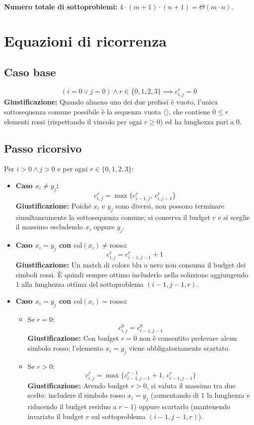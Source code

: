 \medskip
\noindent
\textbf{Numero totale di sottoproblemi:} $4 \cdot (m + 1) \cdot (n + 1) = \Theta(m \cdot n)$.

\section{Equazioni di ricorrenza}

\subsection{Caso base}
\[
    (i = 0 \lor j = 0) \land r \in \{0, 1, 2, 3\} \implies c_{i,j}^r = 0
\]
\textbf{Giustificazione:} Quando almeno uno dei due prefissi è vuoto, l'unica sottosequenza comune possibile è la sequenza vuota $\langle \rangle$, che contiene $0 \le r$ elementi rossi (rispettando il vincolo per ogni $r \ge 0$) ed ha lunghezza pari a $0$.

\subsection{Passo ricorsivo}
Per $i > 0 \land j > 0$ e per ogni $r \in \{0, 1, 2, 3\}$:
\begin{itemize}
    \item \textbf{Caso $x_i \neq y_j$:}
    \[
        c_{i,j}^r = \max \{ c_{i-1, j}^r, \, c_{i, j-1}^r \}
    \]
    \textbf{Giustificazione:} Poiché $x_i$ e $y_j$ sono diversi, non possono terminare simultaneamente la sottosequenza comune; si conserva il budget $r$ e si sceglie il massimo escludendo $x_i$ oppure $y_j$.

    \item \textbf{Caso $x_i = y_j$ con $\text{col}(x_i) \neq \text{rosso}$:}
    \[
        c_{i,j}^r = c_{i-1, j-1}^r + 1
    \]
    \textbf{Giustificazione:} Un match di colore blu o nero non consuma il budget dei simboli rossi. È quindi sempre ottimo includerlo nella soluzione aggiungendo $1$ alla lunghezza ottima del sottoproblema $(i-1, j-1, r)$.

    \item \textbf{Caso $x_i = y_j$ con $\text{col}(x_i) = \text{rosso}$:}
    \begin{itemize}
        \item Se $r = 0$:
        \[
            c_{i,j}^0 = c_{i-1, j-1}^0
        \]
        \textbf{Giustificazione:} Con budget $r = 0$ non è consentito prelevare alcun simbolo rosso; l'elemento $x_i = y_j$ viene obbligatoriamente scartato.
        \item Se $r > 0$:
        \[
            c_{i,j}^r = \max \{ c_{i-1, j-1}^{r-1} + 1, \, c_{i-1, j-1}^r \}
        \]
        \textbf{Giustificazione:} Avendo budget $r > 0$, si valuta il massimo tra due scelte: includere il simbolo rosso $x_i = y_j$ (aumentando di $1$ la lunghezza e riducendo il budget residuo a $r-1$) oppure scartarlo (mantenendo invariato il budget $r$ sul sottoproblema $(i-1, j-1, r)$).
    \end{itemize}
\end{itemize}

